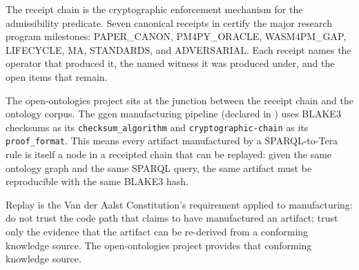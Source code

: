 The receipt chain is the cryptographic enforcement mechanism for the admissibility predicate.
Seven canonical receipts in  certify the major research
program milestones: PAPER\_CANON, PM4PY\_ORACLE, WASM4PM\_GAP, LIFECYCLE, MA, STANDARDS, and
ADVERSARIAL. Each receipt names the operator that produced it, the named witness it was
produced under, and the open items that remain.

The open-ontologies project sits at the junction between the receipt chain and the ontology
corpus. The ggen manufacturing pipeline (declared in ) uses BLAKE3
checksums as its \texttt{checksum\_algorithm} and \texttt{cryptographic-chain} as its
\texttt{proof\_format}. This means every artifact manufactured by a SPARQL-to-Tera rule is
itself a node in a receipted chain that can be replayed: given the same ontology graph and
the same SPARQL query, the same artifact must be reproducible with the same BLAKE3 hash.

Replay is the Van der Aalst Constitution's requirement applied to manufacturing: do not trust
the code path that claims to have manufactured an artifact; trust only the evidence that the
artifact can be re-derived from a conforming knowledge source. The open-ontologies project
provides that conforming knowledge source.
